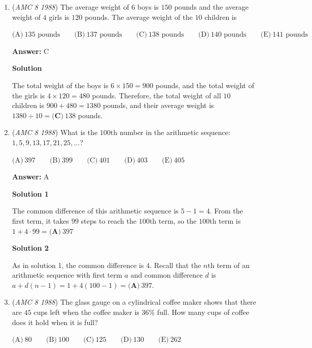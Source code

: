 \begin{enumerate}
 


	\item (\textit{AMC 8 1988}) The average weight of $6$ boys is $150$ pounds and the average weight of $4$ girls is $120$ pounds.  The average weight of the $10$ children is 


 $\text{(A)}\ 135\text{ pounds} \qquad \text{(B)}\ 137\text{ pounds} \qquad \text{(C)}\ 138\text{ pounds} \qquad \text{(D)}\ 140\text{ pounds} \qquad \text{(E)}\ 141\text{ pounds}$

 \textbf{Answer: }C



\textbf{Solution}

The total weight of the boys is $6 \times 150 = 900$ pounds, and the total weight of the girls is $4 \times 120 = 480$ pounds.  Therefore, the total weight of all $10$ children is $900 + 480 = 1380$ pounds, and their average weight is $1380 \div 10 = \boxed{\textbf{(C)}\ 138}$ pounds.

 


	\item (\textit{AMC 8 1988}) What is the $100\text{th}$ number in the arithmetic sequence: $1,5,9,13,17,21,25,...$?


 $\text{(A)}\ 397 \qquad \text{(B)}\ 399 \qquad \text{(C)}\ 401 \qquad \text{(D)}\ 403 \qquad \text{(E)}\ 405$

 \textbf{Answer: }A



\textbf{Solution 1}

The common difference of this arithmetic sequence is $5 - 1 = 4$.  From the first term, it takes $99$ steps to reach the $100\text{th}$ term, so the $100\text{th}$ term is $1 + 4\cdot99 = \boxed{\textbf{(A)}\ 397}$




\textbf{Solution 2}

As in solution 1, the common difference is $4$.  Recall that the $n\text{th}$ term of an arithmetic sequence with first term $a$ and common difference $d$ is $a + d(n-1) = 1 + 4(100-1) = \boxed{\textbf{(A)}\ 397}$.

 


	\item (\textit{AMC 8 1988}) The glass gauge on a cylindrical coffee maker shows that there are $45$ cups left when the coffee maker is $36\%$ full.  How many cups of coffee does it hold when it is full?


 $\text{(A)}\ 80 \qquad \text{(B)}\ 100 \qquad \text{(C)}\ 125 \qquad \text{(D)}\ 130 \qquad \text{(E)}\ 262$


\end{enumerate}
